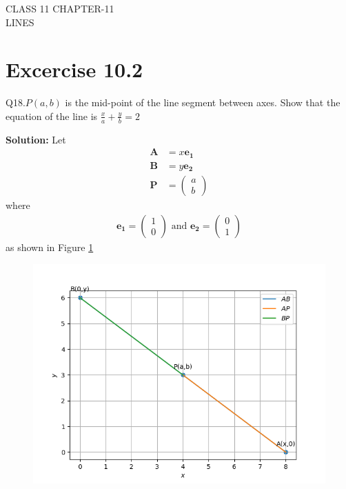 \documentclass[12pt]{article}
\newcommand{\solution}{\noindent \textbf{Solution: }}
\newcommand{\myvec}[1]{\ensuremath{\begin{pmatrix}#1\end{pmatrix}}}
\let\vec\mathbf
\begin{document}
\begin{center}
\textbf\large{CLASS 11 CHAPTER-11 \\ LINES}

\end{center}
\section*{Excercise 10.2}

Q18.$P(a,b)$ is the mid-point of the line segment between axes. Show that the equation of the line is $\frac{x}{a}+\frac{y}{b}=2$

\solution
Let
\begin{align}
	\vec{A}&=x\vec{e_{1}}\\
	\vec{B}&=y\vec{e_{2}}\\
	\vec{P}&=\myvec{a\\b}
\end{align}
where
\begin{align}
	\vec{e_{1}}=\myvec{1\\0} \text{ and } \vec{e_{2}}=\myvec{0\\1}
\end{align}
as shown in Figure \ref{fig:Fig1}
\begin{figure}[!h]
	\begin{center} 
	    \includegraphics[width=\columnwidth]{figs/line1}
	\end{center}
\caption{}
\label{fig:Fig1}
\end{figure}
\end{document}
